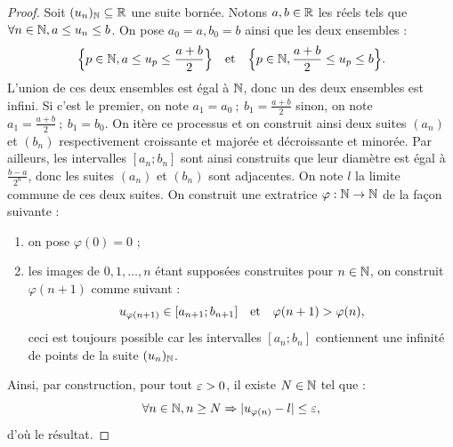 \documentclass{article}
\begin{document}
\begin{proof}
Soit $(u_n)_{\mathbb{N}} \subseteq \mathbb{R}$ une suite bornée. Notons $a, b \in \mathbb{R}$ les réels tels que $\forall n \in \mathbb{N}, a \leq u_n \leq b$.
On pose $a_0 = a, b_0 = b$ ainsi que les deux ensembles :
\[ \Bigl\{ p \in \mathbb{N}, a \leq u_p \leq \dfrac{a+b}2 \Bigr\} \quad \text{et} \quad \Bigl\{ p \in \mathbb{N}, \dfrac{a+b}2 \leq u_p \leq b \Bigr\} . \]
L'union de ces deux ensembles est égal à $\mathbb{N}$, donc un des deux ensembles est infini.
Si c'est le premier, on note $a_1 = a_0 ~;~ b_1 = \frac{a+b}{2}$ sinon, on note $a_1= \frac{a+b}{2} ~;~ b_1 = b_0$.
On itère ce processus et on construit ainsi deux suites $(a_n)$ et $(b_n)$ respectivement croissante et majorée et décroissante et minorée.
Par ailleurs, les intervalles $[a_n ; b_n]$ sont ainsi construits que leur diamètre est égal à $\frac{b-a}{2^n}$, donc les suites 
$(a_n)$ et $(b_n)$ sont adjacentes. On note $l$ la limite commune de ces deux suites.
On construit une extratrice $\varphi : \mathbb{N} \to \mathbb{N}$ de la façon suivante :
\begin{enumerate}[label=(\alph*)]
\item on pose $\varphi(0) = 0$ ;
\item les images de $0, 1, \dots, n$ étant supposées construites pour $n \in \mathbb{N}$, on construit $\varphi(n+1)$ comme suivant :
\[ u_{\varphi(n+1)} \in [a_{n+1} ; b_{n+1}] \quad \text{et} \quad \varphi(n+1) > \varphi(n) , \]
ceci est toujours possible car les intervalles $[a_n; b_n]$ contiennent une infinité de points de la suite $(u_n)_{\mathbb{N}}$.
\end{enumerate}
Ainsi, par construction, pour tout $\varepsilon > 0$, il existe $N \in \mathbb{N}$ tel que : 
\[ \forall n \in \mathbb{N}, n \geq N \Rightarrow \lvert u_{\varphi(n)} - l\rvert \leq \varepsilon , \]
d'où le résultat.
\end{proof}
\end{document}
